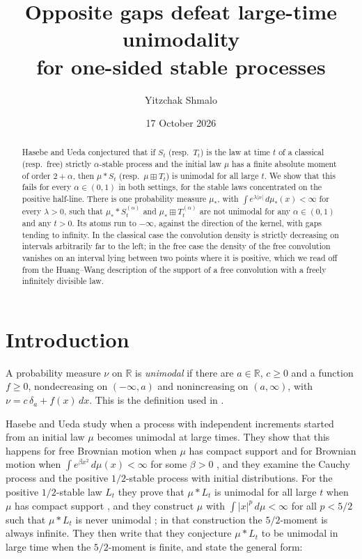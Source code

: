\documentclass[11pt]{amsart}
\title[Opposite gaps and large-time unimodality]{Opposite gaps defeat large-time unimodality\\ for one-sided stable processes}
\author{Yitzchak Shmalo}
\date{17 October 2026}
\theoremstyle{definition}
\theoremstyle{remark}
\numberwithin{equation}{section}
\newcommand{\R}{\mathbb R}
\newcommand{\bp}{\boxplus}
\begin{document}
\begin{abstract}
Hasebe and Ueda conjectured that if $S_t$ (resp.\ $T_t$) is the law at time $t$ of a classical (resp.\ free) strictly $\alpha$-stable process and the initial law $\mu$ has a finite absolute moment of order $2+\alpha$, then $\mu*S_t$ (resp.\ $\mu\bp T_t$) is unimodal for all large $t$. We show that this fails for every $\alpha\in(0,1)$ in both settings, for the stable laws concentrated on the positive half-line. There is one probability measure $\mu_\ast$, with $\int e^{\lambda|x|}\,d\mu_\ast(x)<\infty$ for every $\lambda>0$, such that $\mu_\ast*S^{(\alpha)}_t$ and $\mu_\ast\bp T^{(\alpha)}_t$ are not unimodal for any $\alpha\in(0,1)$ and any $t>0$. Its atoms run to $-\infty$, against the direction of the kernel, with gaps tending to infinity. In the classical case the convolution density is strictly decreasing on intervals arbitrarily far to the left; in the free case the density of the free convolution vanishes on an interval lying between two points where it is positive, which we read off from the Huang--Wang description of the support of a free convolution with a freely infinitely divisible law.
\end{abstract}
\maketitle

\section{Introduction}\label{sec:intro}

A probability measure $\nu$ on $\R$ is \emph{unimodal} if there are $a\in\R$, $c\ge0$ and a function $f\ge0$, nondecreasing on $(-\infty,a)$ and nonincreasing on $(a,\infty)$, with $\nu=c\,\delta_a+f(x)\,dx$. This is the definition used in \cite{HU}.

Hasebe and Ueda \cite{HU} study when a process with independent increments started from an initial law $\mu$ becomes unimodal at large times. They show that this happens for free Brownian motion when $\mu$ has compact support and for Brownian motion when $\int e^{\beta x^2}\,d\mu(x)<\infty$ for some $\beta>0$ \cite[Theorems 1.2 and 1.3]{HU}, and they examine the Cauchy process and the positive $1/2$-stable process with initial distributions. For the positive $1/2$-stable law $L_t$ they prove that $\mu*L_t$ is unimodal for all large $t$ when $\mu$ has compact support \cite[Theorem 5.3]{HU}, and they construct $\mu$ with $\int|x|^p\,d\mu<\infty$ for all $p<5/2$ such that $\mu*L_t$ is never unimodal \cite[Proposition 5.4]{HU}; in that construction the $5/2$-moment is always infinite. They then write that they conjecture $\mu*L_t$ to be unimodal in large time when the $5/2$-moment is finite, and state the general form:
\end{document}
